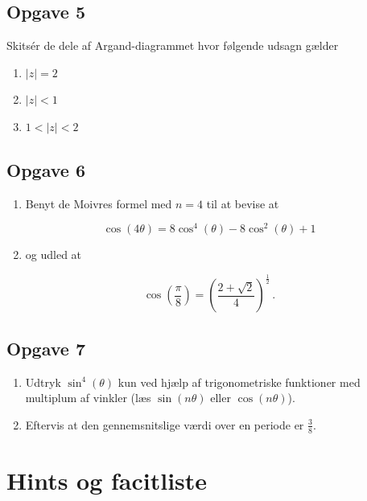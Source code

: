 \documentclass[a4paper, 12pt,titlepage]{article}
\begin{document}
\subsection*{Opgave 5}
\label{sec:orgc81090c}
Skitsér de dele af Argand-diagrammet hvor følgende udsagn gælder

\begin{enumerate}
\item \(|z| = 2\)
\item \(|z| < 1\)
\item \(1<|z|<2\)
\end{enumerate}

\subsection*{Opgave 6}
\label{sec:org50f6406}
\begin{enumerate}
\item Benyt de Moivres formel med \(n=4\) til at bevise at
\end{enumerate}

$$\cos(4 \theta) = 8\cos^4(\theta) - 8 \cos^2(\theta) +1$$

\begin{enumerate}
\setcounter{enumi}{1}
\item og udled at
\end{enumerate}

$$\cos\left(\frac{\pi}{8}\right) = \left(\frac{2 + \sqrt{2}}{4}\right)^{\frac{1}{2}}\,.$$

\subsection*{Opgave 7}
\label{sec:org430dcf4}
\begin{enumerate}
\item Udtryk \(\sin^4(\theta)\) kun ved hjælp af trigonometriske funktioner med multiplum af vinkler (læs \(\sin(n\theta)\) eller \(\cos(n\theta)\)).

\item Eftervis at den gennemsnitslige værdi over en periode er \(\frac{3}{8}\).
\end{enumerate}


\newpage

\section{Hints og facitliste}
\label{sec:orgd4fd7e5}
\end{document}
